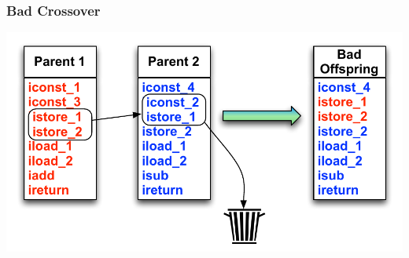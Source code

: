 \documentclass{beamer}
\begin{document}
\begin{frame}
  \frametitle{Bad Crossover}
  \includegraphics[height=.5\textheight]{Illustrations/badCrossover.pdf}
\end{frame}
\end{document}
